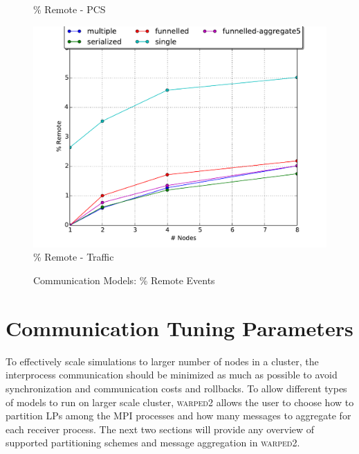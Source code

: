 \documentclass[11pt]{book}
\begin{document}
\begin{figure}
\begin{minipage}{.5\textwidth}
\begin{center}
      \% Remote - PCS \\
    \end{center}
  \end{minipage}
  \centering
  \begin{minipage}{.5\textwidth}
    \begin{center}
      \includegraphics[width=\textwidth,keepaspectratio,quiet]{figs/partitioning_communication/communication_traffic_premote.pdf} \\
      \% Remote - Traffic \\
    \end{center}
  \end{minipage}%
  \hfill
  \caption{Communication Models: \% Remote Events}\label{communication_model_premote} 
\end{figure}

\section{Communication Tuning Parameters}

To effectively scale simulations to larger number of nodes in a cluster, the interprocess communication
should be minimized as much as possible to avoid synchronization and communication costs
and rollbacks. To allow different types of models to run on larger scale cluster, \textsc{warped2}
allows the user to choose how to partition LPs among the MPI processes and how many messages
to aggregate for each receiver process. The next two sections will provide any overview
of supported partitioning schemes and message aggregation in \textsc{warped2}.
\end{document}
